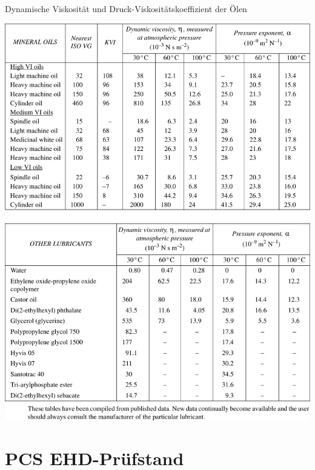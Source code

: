 \begin{appendices}
        \begin{table}
            \caption{Dynamische Viskosität und Druck-Viskositätskoeffizient der Ölen \cite{esdu_1985}}
            \includegraphics{./tables/esdu_oils_table.pdf}
            \label{tab:esdu_oil_daten}
        \end{table}

    \chapter{PCS EHD-Prüfstand}


\end{appendices}
